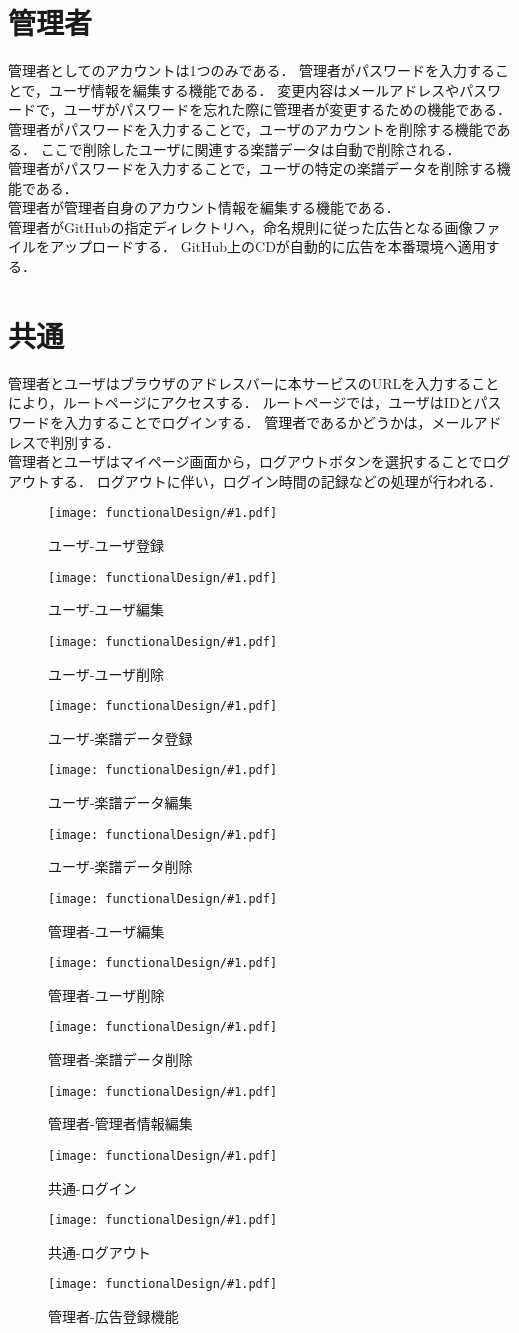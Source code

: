 \section{管理者}
管理者としてのアカウントは1つのみである．
管理者がパスワードを入力することで，ユーザ情報を編集する機能である．
変更内容はメールアドレスやパスワードで，ユーザがパスワードを忘れた際に管理者が変更するための機能である．\\
管理者がパスワードを入力することで，ユーザのアカウントを削除する機能である．
ここで削除したユーザに関連する楽譜データは自動で削除される．\\
管理者がパスワードを入力することで，ユーザの特定の楽譜データを削除する機能である．\\
管理者が管理者自身のアカウント情報を編集する機能である．\\
管理者がGitHubの指定ディレクトリへ，命名規則に従った広告となる画像ファイルをアップロードする．
GitHub上のCDが自動的に広告を本番環境へ適用する．
\section{共通}
管理者とユーザはブラウザのアドレスバーに本サービスのURLを入力することにより，ルートページにアクセスする．
ルートページでは，ユーザはIDとパスワードを入力することでログインする．
管理者であるかどうかは，メールアドレスで判別する．\\
管理者とユーザはマイページ画面から，ログアウトボタンを選択することでログアウトする．
ログアウトに伴い，ログイン時間の記録などの処理が行われる．
\newcommand{\icd}[2]{\begin{figure}[p]\centering\texttt{[image: functionalDesign/\#1.pdf]}\caption{#2}\label{#2}\end{figure}}
    \icd{211-機能設計-利用者側-ユーザ登録}{ユーザ-ユーザ登録}
    \icd{212-機能設計-利用者側-ユーザ編集}{ユーザ-ユーザ編集}
    \icd{213-機能設計-利用者側-ユーザ削除}{ユーザ-ユーザ削除}
    \icd{214-機能設計-利用者側-楽譜データ登録}{ユーザ-楽譜データ登録}
    \icd{215-機能設計-利用者側-楽譜データ編集}{ユーザ-楽譜データ編集}
    \icd{216-機能設計-利用者側-楽譜データ削除}{ユーザ-楽譜データ削除}
    \icd{221-機能設計-管理者側-ユーザ編集}{管理者-ユーザ編集}
    \icd{222-機能設計-管理者側-ユーザ削除}{管理者-ユーザ削除}
    \icd{223-機能設計-管理者側-楽譜データ削除}{管理者-楽譜データ削除}
    \icd{224-機能設計-管理者側-管理者情報編集機能}{管理者-管理者情報編集}
    \icd{217-機能設計-利用者側-ログイン}{共通-ログイン}
    \icd{218-機能設計-利用者側-ログアウト}{共通-ログアウト}
    \icd{225-機能設計-管理者側-広告登録機能}{管理者-広告登録機能}
